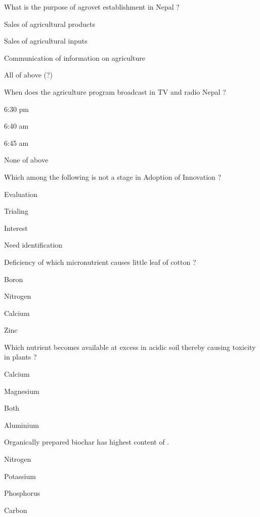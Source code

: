 \begin{questions}
\question What is the purpose of agrovet establishment in Nepal ?
\begin{items}
\item Sales of agricultural products
\item Sales of agricultural inputs
\item Communication of information on agriculture
\item* All of above (?)
\end{items}

\question When does the agriculture program broadcast in TV and radio Nepal ?
\begin{items}
\item 6:30 pm
\item 6:40 am
\item 6:45 am
\item* None of above
\end{items}

\question Which among the following is not a stage in Adoption of Innovation ?
\begin{items}
\item Evaluation
\item Trialing
\item Interest
\item* Need identification
\end{items}

\question Deficiency of which micronutrient causes little leaf of cotton ?
\begin{items}
\item Boron
\item Nitrogen
\item Calcium
\item* Zinc
\end{items}

\question Which nutrient becomes available at excess in acidic soil thereby causing toxicity in plants ?
\begin{items}
\item Calcium
\item Magnesium
\item Both
\item* Aluminium
\end{items}

\question Organically prepared biochar has highest content of \fillin[][3cm].
\begin{items}
\item Nitrogen
\item Potassium
\item Phosphorus
\item* Carbon
\end{items}


\end{questions}
